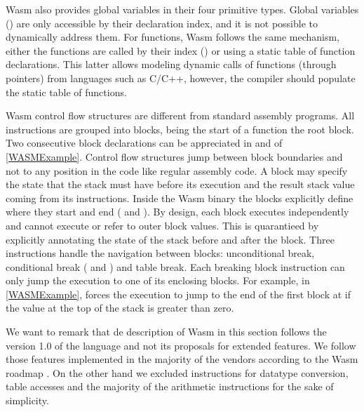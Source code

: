 Wasm also provides global variables in their four primitive types. Global variables () are only accessible by their declaration index, and it is not possible to dynamically address them. For functions, Wasm follows the same mechanism, either the functions are called by their index () or using a static table of function declarations. This latter allows modeling dynamic calls of functions (through pointers) from languages such as C/C++, however, the compiler should populate the static table of functions.


Wasm control flow structures are different from standard assembly programs. All instructions are grouped into blocks, being the start of a function the root block. Two consecutive block declarations can be appreciated in  and  of \autoref{WASMExample}. Control flow structures jump between block boundaries and not to any position in the code like regular assembly code. A block may specify the state that the stack must have before its execution and the result stack value coming from its instructions. Inside the Wasm binary the blocks explicitly define where they start and end ( and ). By design, each block executes independently and cannot execute or refer to outer block values. This is quarantieed by explicitly annotating the state of the stack before and after the block. Three instructions handle the navigation between blocks: unconditional break, conditional break ( and ) and table break. Each breaking block instruction can only jump the execution to one of its enclosing blocks. For example, in \autoref{WASMExample},  forces the execution to jump to the end of the first block at  if the value at the top of the stack is greater than zero.

We want to remark that de description of Wasm in this section follows the version 1.0 of the language and not its proposals for extended features. We follow those features implemented in the majority of the vendors according to the Wasm roadmap \cite{wasm_roadmap}. On the other hand we excluded instructions for datatype conversion, table accesses and the majority of the arithmetic instructions for the sake of simplicity.


